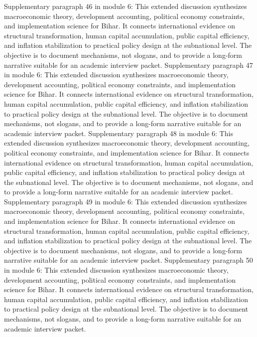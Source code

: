 \documentclass[preprint,12pt]{elsarticle}
\begin{document}
Supplementary paragraph 46 in module 6: This extended discussion synthesizes macroeconomic theory, development accounting, political economy constraints, and implementation science for Bihar. It connects international evidence on structural transformation, human capital accumulation, public capital efficiency, and inflation stabilization to practical policy design at the subnational level. The objective is to document mechanisms, not slogans, and to provide a long-form narrative suitable for an academic interview packet.
Supplementary paragraph 47 in module 6: This extended discussion synthesizes macroeconomic theory, development accounting, political economy constraints, and implementation science for Bihar. It connects international evidence on structural transformation, human capital accumulation, public capital efficiency, and inflation stabilization to practical policy design at the subnational level. The objective is to document mechanisms, not slogans, and to provide a long-form narrative suitable for an academic interview packet.
Supplementary paragraph 48 in module 6: This extended discussion synthesizes macroeconomic theory, development accounting, political economy constraints, and implementation science for Bihar. It connects international evidence on structural transformation, human capital accumulation, public capital efficiency, and inflation stabilization to practical policy design at the subnational level. The objective is to document mechanisms, not slogans, and to provide a long-form narrative suitable for an academic interview packet.
Supplementary paragraph 49 in module 6: This extended discussion synthesizes macroeconomic theory, development accounting, political economy constraints, and implementation science for Bihar. It connects international evidence on structural transformation, human capital accumulation, public capital efficiency, and inflation stabilization to practical policy design at the subnational level. The objective is to document mechanisms, not slogans, and to provide a long-form narrative suitable for an academic interview packet.
Supplementary paragraph 50 in module 6: This extended discussion synthesizes macroeconomic theory, development accounting, political economy constraints, and implementation science for Bihar. It connects international evidence on structural transformation, human capital accumulation, public capital efficiency, and inflation stabilization to practical policy design at the subnational level. The objective is to document mechanisms, not slogans, and to provide a long-form narrative suitable for an academic interview packet.
\end{document}
